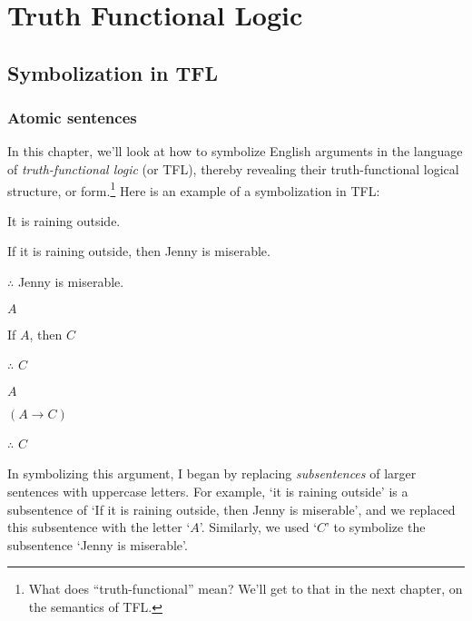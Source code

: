 \part{Truth Functional Logic}
\chapter{Symbolization in TFL}



\section{Atomic sentences}\label{s:tfl-sym-atomic}

In this chapter, we'll look at how to symbolize English arguments in the language of \emph{truth-functional logic} (or TFL), thereby revealing their truth-functional logical structure, or form.\footnote{What does ``truth-functional'' mean?  We'll get to that in the next chapter, on the semantics of TFL.}  Here is an example of a symbolization in TFL:


	\begin{earg}
		\item[\ex{exarg1}] It is raining outside.
		\item[] If it is raining outside, then Jenny is miserable.
		\item[] $\therefore$ Jenny is miserable.
	\end{earg}


\begin{multicols}{2}

	\begin{earg}
		\item[] $A$
		\item[] If $A$, then $C$
		\item[] $\therefore$ $C$
	\end{earg}

\columnbreak

	\begin{earg}
		\item[] $A$
		\item[] $(A \rightarrow C)$
		\item[] $\therefore$ $C$
	\end{earg}


\end{multicols}


In symbolizing this argument, I began by replacing  \emph{subsentences} of larger sentences with uppercase letters. For example, `it is raining outside' is a subsentence of `If it is raining outside, then Jenny is miserable', and we replaced this subsentence with the letter `$A$'.  Similarly, we used `$C$' to symbolize the subsentence `Jenny is miserable'.


